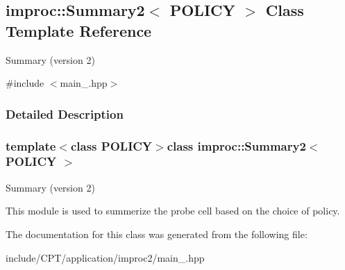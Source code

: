 \hypertarget{classimproc_1_1_summary2}{\subsection{improc\-:\-:Summary2$<$ P\-O\-L\-I\-C\-Y $>$ Class Template Reference}
\label{classimproc_1_1_summary2}
}


Summary (version 2)  




{\ttfamily \#include $<$main\-\_\-.\-hpp$>$}



\subsubsection{Detailed Description}
\subsubsection*{template$<$class P\-O\-L\-I\-C\-Y$>$class improc\-::\-Summary2$<$ P\-O\-L\-I\-C\-Y $>$}

Summary (version 2) 

This module is used to summerize the probe cell based on the choice of policy. 

The documentation for this class was generated from the following file\-:\begin{DoxyCompactItemize}
\item 
include/\-C\-P\-T/application/improc2/main\-\_\-.\-hpp\end{DoxyCompactItemize}
